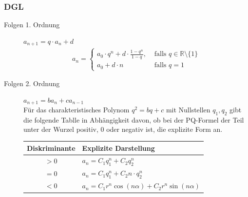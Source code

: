 \documentclass[11pt, a4paper]{article}
\begin{document}
\subsubsection{DGL}
\begin{description}
	\item[Folgen 1. Ordnung] $a_{n+1} = q \cdot a_n + d$
		\begin{align*}
			a_n = \begin{cases}
				a_0 \cdot q^n + d \cdot \frac{1-q^n}{1-q}, &\text{ falls } q \in \mathbb{R} \setminus \{1\} \\
				a_0 + d \cdot n &\text{ falls } q=1
					\end{cases}
		\end{align*}
	\item[Folgen 2. Ordnung] $a_{n+1} = b a_n + c a_{n-1}$ \vspace{0.3cm} \\
		Für das charakteristisches Polynom $q^2 = bq+c$ mit Nullstellen $q_1, q_2$ gibt die folgende Tablle in Abhängigkeit davon, ob bei der PQ-Formel der Teil unter der Wurzel positiv, $0$ oder negativ ist, die explizite Form an.
		
		\begin{tabular}{|c|l|}
			\hline
			Diskriminante & Explizite Darstellung \\ \hline
			$>0$ & $a_n = C_1 q_1^n + C_2 q_2^n$ \\
			$=0$ & $a_n = C_1 q_1^n + C_2 n \cdot q_2^n$ \\
			$<0$ & $a_n = C_1 r^n \cos(n\alpha) + C_2 r^n \sin(n\alpha)$ \\ \hline
		\end{tabular}
\end{description}
\end{document}
